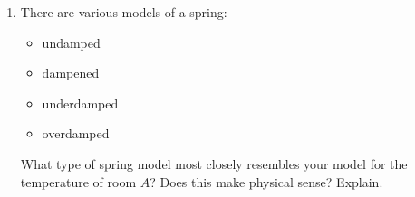 \begin{enumerate}
\begin{enumerate}
    \item There are various models of a spring:
    \begin{itemize}
        \item undamped
        \item dampened
        \item underdamped
        \item overdamped
    \end{itemize}
    
    What type of spring model most closely resembles your model for the temperature of room $A$? Does this make physical sense? Explain.
    
\end{enumerate}



\end{enumerate}